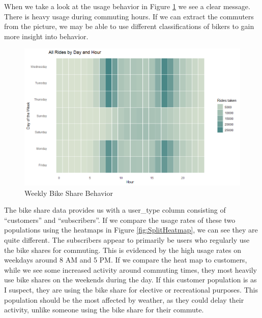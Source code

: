 \documentclass{report}
\begin{document}
	When we take a look at the usage behavior in Figure \ref{fig:AllHeatmap} we see a clear message. There is heavy usage during commuting hours. If we can extract the commuters from the picture, we may be able to use different classifications of bikers to gain more insight into behavior.

\begin{figure}[h!]
	\includegraphics[width=\linewidth]{HeatmapAll.png}
	\caption{Weekly Bike Share Behavior}
	\label{fig:AllHeatmap}
\end{figure}


	The bike share data provides us with a user\_type column consisting of “customers” and “subscribers”. If we compare the usage rates of these two populations using the heatmaps in Figure \ref{fig:SplitHeatmap}, we can see they are quite different. The subscribers appear to primarily be users who regularly use the bike shares for commuting. This is evidenced by the high usage rates on weekdays around 8 AM and 5 PM. If we compare the heat map to customers, while we see some increased activity around commuting times, they most heavily use bike shares on the weekends during the day. If this customer population is as I suspect, they are using the bike share for elective or recreational purposes. This population should be the most affected by weather, as they could delay their activity, unlike someone using the bike share for their commute.
\end{document}
